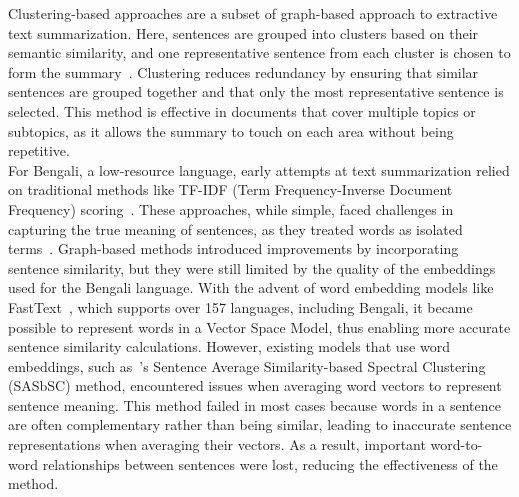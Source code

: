 Clustering-based approaches are a subset of graph-based approach
to extractive text summarization.
Here, sentences are grouped into clusters based on their
semantic similarity, and one representative sentence from each cluster is chosen
to form the summary~\cite{Mohan-2022-topic-modeling-rev-clustering}.
Clustering reduces redundancy by ensuring that similar
sentences are grouped together and that only the most
representative sentence is selected.
This method is effective in documents that cover multiple
topics or subtopics, as it allows the summary to touch on
each area without being repetitive.\\

For Bengali, a low-resource language, early attempts at text
summarization relied on traditional methods like TF-IDF
(Term Frequency-Inverse Document Frequency)
scoring~\cite{Akter-2017-tfidf-3,das-2022-tfidf,
    sarkar-2012-tfidf,sarkar-2012-tfidf-2}.
These approaches, while simple, faced challenges in
capturing the true meaning of sentences, as they treated words as
isolated terms~\cite{tas-2017-rev-text-sum-2}.
Graph-based methods introduced improvements by
incorporating sentence similarity, but they were still limited by the
quality of the embeddings used for the Bengali language.
With the advent of word embedding models like
FastText~\cite{grave-etal-2018-fasttext}, which supports over 157
languages, including Bengali, it became possible to
represent words in a Vector Space Model, thus enabling
more accurate sentence similarity calculations.
However, existing models that use word embeddings,
such as~\citeauthor{roychowdhury-etal-2022-spectral-base}’s
\cite{roychowdhury-etal-2022-spectral-base} Sentence
Average Similarity-based Spectral Clustering (SASbSC) method,
encountered issues when averaging word vectors to represent sentence meaning.
This method failed in most cases because words in a sentence
are often complementary rather than being similar, leading
to inaccurate sentence representations when averaging their vectors.
As a result, important word-to-word relationships between
sentences were lost, reducing the effectiveness of the method.\\

